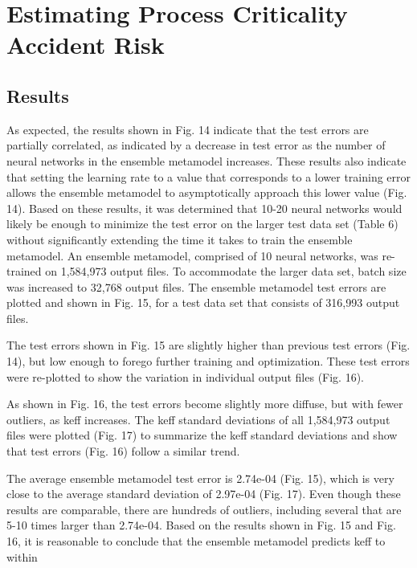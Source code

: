 
\chapter{Estimating Process Criticality Accident Risk}


\section{Results}

As expected, the results shown in Fig. 14 indicate that the test errors are partially correlated, as indicated by a decrease in test error as the number of neural networks in the ensemble metamodel increases.
These results also indicate that setting the learning rate to a value that corresponds to a lower training error allows the ensemble metamodel to asymptotically approach this lower value (Fig. 14).
Based on these results, it was determined that 10-20 neural networks would likely be enough to minimize the test error on the larger test data set (Table 6) without significantly extending the time it takes to train the ensemble metamodel.
An ensemble metamodel, comprised of 10 neural networks, was re-trained on 1,584,973 output files.
To accommodate the larger data set, batch size was increased to 32,768 output files.
The ensemble metamodel test errors are plotted and shown in Fig. 15, for a test data set that consists of 316,993 output files.

The test errors shown in Fig. 15 are slightly higher than previous test errors (Fig. 14), but low enough to forego further training and optimization.
These test errors were re-plotted to show the variation in individual output files (Fig. 16).

As shown in Fig. 16, the test errors become slightly more diffuse, but with fewer outliers, as keff increases.
The keff standard deviations of all 1,584,973 output files were plotted (Fig. 17) to summarize the keff standard deviations and show that test errors (Fig. 16) follow a similar trend.

The average ensemble metamodel test error is 2.74e-04 (Fig. 15), which is very close to the average standard deviation of 2.97e-04 (Fig. 17).
Even though these results are comparable, there are hundreds of outliers, including several that are 5-10 times larger than 2.74e-04.
Based on the results shown in Fig. 15 and Fig. 16, it is reasonable to conclude that the ensemble metamodel predicts keff to within %

